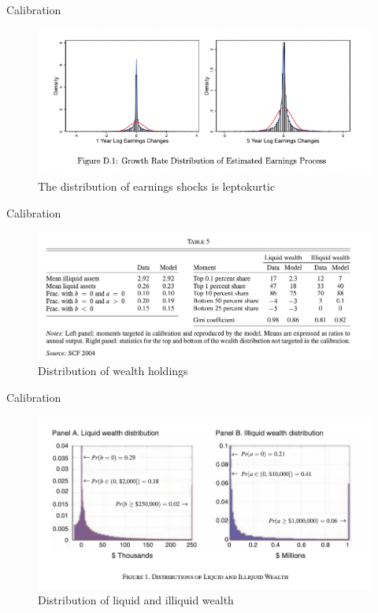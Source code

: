 \documentclass[english,xcolor=svgnames]{beamer}
\begin{document}
\begin{frame}{Calibration}
\begin{figure}
\includegraphics[scale=0.5]{figures/kmv_2}\\
The distribution of earnings shocks is leptokurtic
\end{figure}
\end{frame}


\begin{frame}{Calibration}
\begin{figure}
\includegraphics[scale=0.35]{figures/kmv_8}\\
Distribution of wealth holdings
\end{figure}
\end{frame}


\begin{frame}{Calibration}
\begin{figure}
\includegraphics[scale=0.35]{figures/kmv_3}\\
Distribution of liquid and illiquid wealth
\end{figure}
\end{frame}
\end{document}
